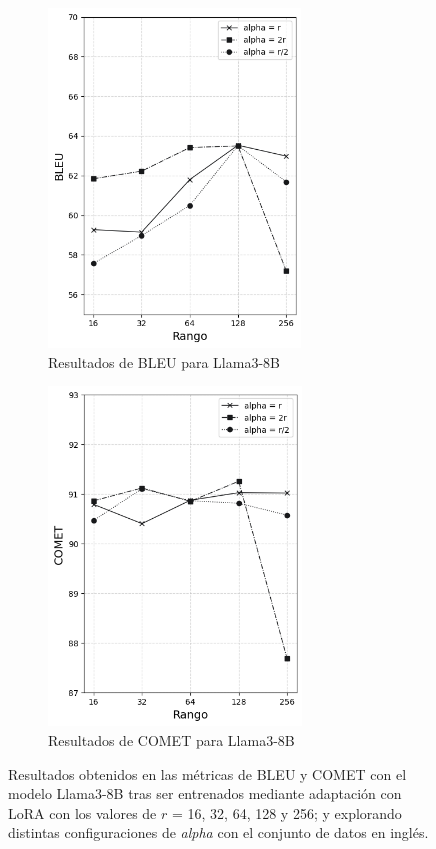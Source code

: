 \documentclass[11pt,spanish,listoffigures,listoftables]{tfgetsinf}
\begin{document}
\begin{figure}
\begin{subfigure}{0.5\textwidth}
\includegraphics[width=0.9\linewidth, height=9cm]{images/llama_BLEU_en_} 
\caption{Resultados de BLEU para Llama3-8B}
\label{fig:subim1}
\end{subfigure}
\begin{subfigure}{0.5\textwidth}
\includegraphics[width=0.9\linewidth, height=9cm]{images/llama_COMET_en_}
\caption{Resultados de COMET para Llama3-8B}
\label{fig:subim2}
\end{subfigure}

\caption{Resultados obtenidos en las métricas de BLEU y COMET con el modelo Llama3-8B tras ser entrenados mediante adaptación con LoRA con los valores de $r$ = 16, 32, 64, 128 y 256;  y explorando distintas configuraciones de \textit{alpha} con el conjunto de datos en inglés.}
\label{fig:graficasLlama inglés}
\end{figure}
\end{document}
